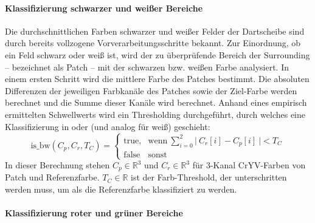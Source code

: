 \vspace*{-0.1cm}
\paragraph{Klassifizierung schwarzer und weißer Bereiche}

Die durchschnittlichen Farben schwarzer und weißer Felder der Dartscheibe sind durch bereits vollzogene Vorverarbeitungsschritte bekannt. Zur Einordnung, ob ein Feld schwarz oder weiß ist, wird der zu überprüfende Bereich der Surrounding -- bezeichnet als Patch -- mit der schwarzen bzw. weißen Farbe analysiert. In einem ersten Schritt wird die mittlere Farbe des Patches bestimmt. Die absoluten Differenzen der jeweiligen Farbkanäle des Patches sowie der Ziel-Farbe werden berechnet und die Summe dieser Kanäle wird berechnet. Anhand eines empirisch ermittelten Schwellwerts wird ein Thresholding durchgeführt, durch welches eine Klassifizierung in  oder  (und analog für weiß) geschieht:
\begin{equation*}
    \text{is\_bw}(C_p, C_r, T_C) =
    \begin{cases}
        \text{true}, & \text{wenn} ~\sum_{i=0}^{2} \vert~ C_r[i] - C_p[i] ~\vert < T_C \\
        \text{false} & \text{sonst}
    \end{cases}
\end{equation*}
In dieser Berechnung stehen $C_p \in \mathbb{R}^3$ und $C_r \in \mathbb{R}^3$ für 3-Kanal CrYV-Farben von Patch und Referenzfarbe. $T_C \in \mathbb{R}$ ist der Farb-Threshold, der unterschritten werden muss, um als die Referenzfarbe klassifiziert zu werden.

\paragraph{Klassifizierung roter und grüner Bereiche}

